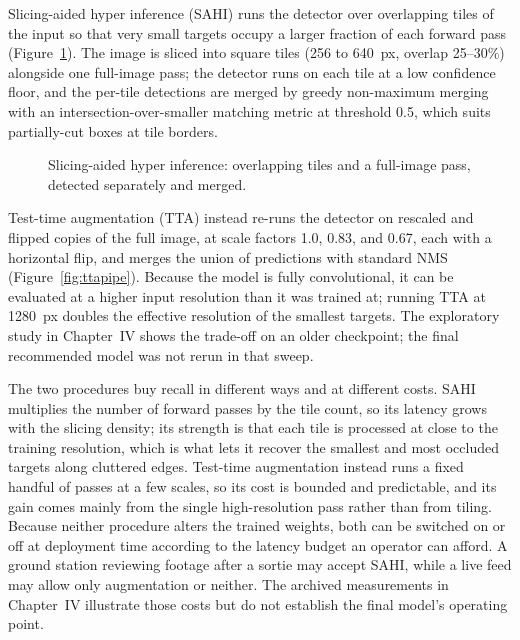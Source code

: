 Slicing-aided hyper inference (SAHI) runs the detector over overlapping tiles of
the input so that very small targets occupy a larger fraction of each forward
pass (Figure~\ref{fig:sahipipe}). The image is sliced into square tiles (256 to
640~px, overlap 25--30\%) alongside one full-image pass; the detector runs on
each tile at a low confidence floor, and the per-tile detections are merged by
greedy non-maximum merging with an intersection-over-smaller matching metric at
threshold 0.5, which suits partially-cut boxes at tile borders.

\begin{figure}[tbp]
  \centering
  \caption[Slicing-aided hyper inference.]{Slicing-aided hyper inference:
  overlapping tiles and a full-image pass, detected separately and merged.}
  \label{fig:sahipipe}
\end{figure}

Test-time augmentation (TTA) instead re-runs the detector on rescaled and
flipped copies of the full image, at scale factors 1.0, 0.83, and 0.67, each
with a horizontal flip, and merges the union of predictions with standard NMS
(Figure~\ref{fig:ttapipe}). Because the model is fully convolutional, it can be
evaluated at a higher input resolution than it was trained at; running TTA at
1280~px doubles the effective resolution of the smallest targets. The
exploratory study in Chapter~IV shows the trade-off on an older checkpoint;
the final recommended model was not rerun in that sweep.

The two procedures buy recall in different ways and at different costs. SAHI
multiplies the number of forward passes by the tile count, so its latency grows
with the slicing density; its strength is that each tile is processed at close
to the training resolution, which is what lets it recover the smallest and most
occluded targets along cluttered edges. Test-time augmentation instead runs a
fixed handful of passes at a few scales, so its cost is bounded and predictable,
and its gain comes mainly from the single high-resolution pass rather than from
tiling. Because neither procedure alters the trained weights, both can be
switched on or off at deployment time according to the latency budget an
operator can afford. A ground station reviewing footage after a sortie may
accept SAHI, while a live feed may allow only augmentation or neither. The
archived measurements in Chapter~IV illustrate those costs but do not establish
the final model's operating point.

